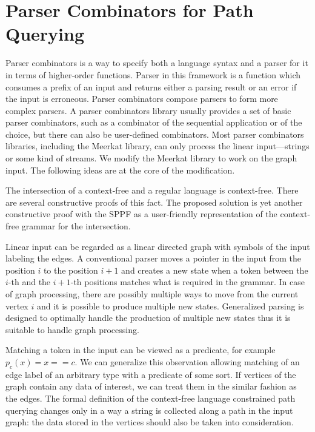 \section{Parser Combinators for Path Querying}
\label{sec:combinators}

Parser combinators is a way to specify both a language syntax and a parser for it in terms of higher-order functions.
Parser in this framework is a function which consumes a prefix of an input and returns either a parsing result or an error if the input is erroneous.
Parser combinators compose parsers to form more complex parsers.
A parser combinators library usually provides a set of basic parser combinators, such as a combinator of the sequential application or of the choice, but there can also be user-defined combinators.
Most parser combinators libraries, including the Meerkat library, can only process the linear input---strings or some kind of streams.
We modify the Meerkat library to work on the graph input. The following ideas are at the core of the modification.

The intersection of a context-free and a regular language is context-free. There are several constructive proofs of this fact.
The proposed solution is yet another constructive proof with the SPPF as a user-friendly representation of the context-free grammar for the intersection.

Linear input can be regarded as a linear directed graph with symbols of the input labeling the edges.
A conventional parser moves a pointer in the input from the position $i$ to the position $i+1$ and creates a new state when a token between the $i$-th and the $i+1$-th positions matches what is required in the grammar.
In case of graph processing, there are possibly multiple ways to move from the current vertex $i$ and it is possible to produce multiple new states.
Generalized parsing is designed to optimally handle the production of multiple new states thus it is suitable to handle graph processing.

Matching a token in the input can be viewed as a predicate, for example $p_c (x) = x == c$.
We can generalize this observation allowing matching of an edge label of an arbitrary type with a predicate of some sort.
If vertices of the graph contain any data of interest, we can treat them in the similar fashion as the edges.
The formal definition of the context-free language constrained path querying changes only in a way a string is collected along a path in the input graph: the data stored in the vertices should also be taken into consideration.

